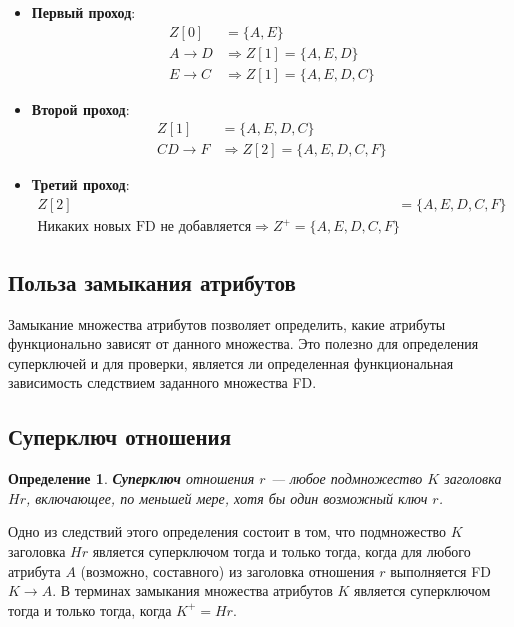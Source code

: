 \documentclass[a4paper,12pt]{article}
\newtheorem{definition}{Определение}
\begin{document}
\begin{itemize}
    \item \textbf{Первый проход}:
    \begin{align*}
        Z[0] &= \{A, E\} \\
        A \rightarrow D &\Rightarrow Z[1] = \{A, E, D\} \\
        E \rightarrow C &\Rightarrow Z[1] = \{A, E, D, C\}
    \end{align*}
    \item \textbf{Второй проход}:
    \begin{align*}
        Z[1] &= \{A, E, D, C\} \\
        CD \rightarrow F &\Rightarrow Z[2] = \{A, E, D, C, F\}
    \end{align*}
    \item \textbf{Третий проход}:
    \begin{align*}
        Z[2] &= \{A, E, D, C, F\} \\
        \text{Никаких новых FD не добавляется} \Rightarrow Z^+ = \{A, E, D, C, F\}
    \end{align*}
\end{itemize}

\subsection{Польза замыкания атрибутов}

Замыкание множества атрибутов позволяет определить, какие атрибуты функционально зависят от данного множества. Это полезно для определения суперключей и для проверки, является ли определенная функциональная зависимость следствием заданного множества FD.

\subsection{Суперключ отношения}

\begin{definition}
    \textbf{Суперключ} отношения $r$ — любое подмножество $K$ заголовка $Hr$, включающее, по меньшей мере, хотя бы один возможный ключ $r$.
\end{definition}

Одно из следствий этого определения состоит в том, что подмножество $K$ заголовка $Hr$ является суперключом тогда и только тогда, когда для любого атрибута $A$ (возможно, составного) из заголовка отношения $r$ выполняется FD $K \rightarrow A$. В терминах замыкания множества атрибутов $K$ является суперключом тогда и только тогда, когда $K^+ = Hr$.
\end{document}
